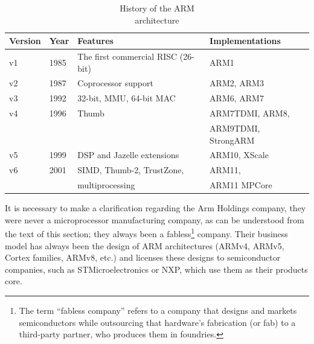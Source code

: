 \begin{table}[htbp]
    \centering
    \begin{tabular}{|l|l|l|l|}
        \hline
        Version & Year  & Features  &   Implementations \\
        \hline
        v1      & 1985  & The first commercial RISC (26-bit) & ARM1 \\
        \hline
        v2      & 1987  & Coprocessor support           & ARM2, ARM3 \\
        \hline
        v3      & 1992  & 32-bit, MMU, 64-bit MAC       & ARM6, ARM7 \\
        \hline
        v4      & 1996  &  Thumb                        & ARM7TDMI, ARM8, \\
                &       &                               & ARM9TDMI, StrongARM \\
        \hline
        v5      & 1999  & DSP and Jazelle extensions    & ARM10, XScale \\
        \hline
        v6      & 2001  & SIMD, Thumb-2, TrustZone,     & ARM11,  \\
                &       & multiprocessing               & ARM11 MPCore\\
        \hline
    \end{tabular}

    \caption
        {
            History of the ARM \\
            architecture
        }

    \cite{Levy2005} \cite{ArmVir2020}
    \label{tab:arm_history}
\end{table}

It is necessary to make a clarification regarding the Arm Holdings company, they 
were never a microprocessor manufacturing company, as can be understood from the 
text of this section; they always been a fabless\footnote{The term “fabless company” refers to a company that designs and markets semiconductors while 
    outsourcing that hardware's fabrication (or fab) to a third-party partner, who produces them in foundries. } company. Their business model has 
always been the design of ARM architectures (ARMv4, ARMv5, Cortex 
families, ARMv8, etc.) and licenses these designs to semiconductor companies, such 
as STMicroelectronics or NXP, which use them as their products core.





%




